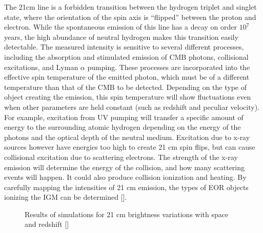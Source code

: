 \documentclass[manuscript]{aastex}
\begin{document}
The 21cm line is a forbidden transition between the hydrogen triplet and singlet state, where the orientation of the spin axis is ``flipped'' between the proton and electron. While the spontaneous emission of this line has a decay on order $10^{7}$ years, the high abundance of neutral hydrogen makes this transition easily detectable. The measured intensity is sensitive to several different processes, including the absorption and stimulated emission of CMB photons, collisional excitations, and Lyman $\alpha$ pumping. These processes are incorporated into the effective spin temperature of the emitted photon, which must be of a different temperature than that of the CMB to be detected. Depending on the type of object creating the emission, this spin temperature will show fluctuations even when other parameters are held constant (such as redshift and peculiar velocity). For example, excitation from UV pumping will transfer a specific amount of energy to the surrounding atomic hydrogen depending on the energy of the photons and the optical depth of the neutral medium. Excitation due to x-ray sources however have energies too high to create 21 cm spin flips, but can cause collisional excitation due to scattering electrons. The strength of the x-ray emission will determine the energy of the collision, and how many scattering events will happen. It could also produce collision ionization and heating. By carefully mapping the intensities of 21 cm emission, the types of EOR objects ionizing the IGM can be determined [\cite{Zaroubi2012}].

\begin{figure}[ht!]
	\centering
	\qquad
	\singlespace
	\caption[21 cm brightness maps for different redshifts. -(\cite{Santos2010})]{Results of simulations for 21 cm brightness variations with space and redshift [\cite{Santos2010}]}%
	\label{fig: Santos et al 2010 Simulated 21cm Brightness}%
\end{figure}
\end{document}
